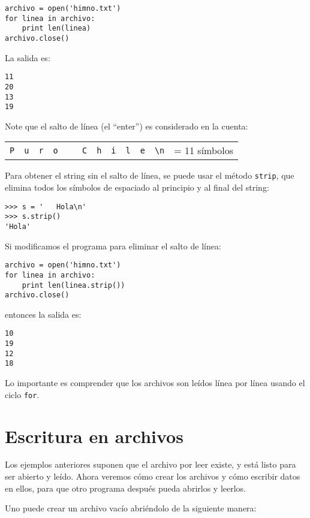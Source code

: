 \begin{lstlisting}
archivo = open('himno.txt')
for linea in archivo:
    print len(linea)
archivo.close()
\end{lstlisting}

La salida es:
\begin{lstlisting}[language=testcase]
11
20
13
19
\end{lstlisting}

Note que el salto de línea (el ``enter'') es considerado en la cuenta:

\begin{tabular}{|*{11}{c|}l}
  \cline{1-11}
  \lstinline!P! &
  \lstinline!u! &
  \lstinline!r! &
  \lstinline!o! &
  \lstinline! ! &
  \lstinline!C! &
  \lstinline!h! &
  \lstinline!i! &
  \lstinline!l! &
  \lstinline!e! &
  \lstinline!\n! &
  = 11 símbolos \\
  \cline{1-11}
\end{tabular}

Para obtener el string sin el salto de línea, se puede usar el método
\lstinline!strip!, que elimina todos los símbolos de espaciado al
principio y al final del string:

\begin{lstlisting}
>>> s = '   Hola\n'
>>> s.strip()
'Hola'
\end{lstlisting}

Si modificamos el programa para eliminar el salto de línea:

\begin{lstlisting}
archivo = open('himno.txt')
for linea in archivo:
    print len(linea.strip())
archivo.close()
\end{lstlisting}
entonces la salida es:
\begin{lstlisting}[language=testcase]
10
19
12
18
\end{lstlisting}

Lo importante es comprender que los archivos son leídos línea por línea
usando el ciclo \lstinline!for!.

\section{Escritura en archivos}

Los ejemplos anteriores suponen que el archivo por leer existe, y está
listo para ser abierto y leído. Ahora veremos cómo crear los archivos y
cómo escribir datos en ellos, para que otro programa después pueda
abrirlos y leerlos.

Uno puede crear un archivo vacío abriéndolo de la siguiente manera:

